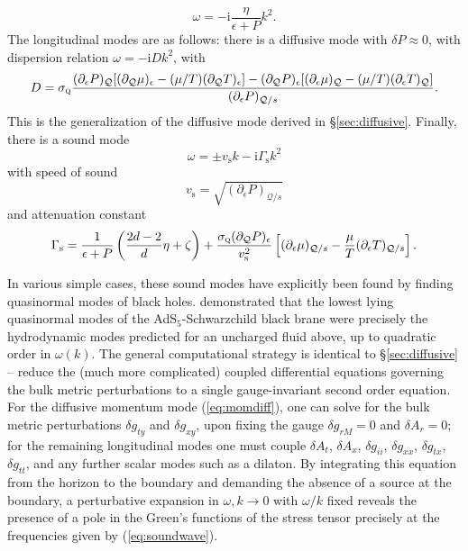 \documentclass[10pt, oneside]{book}
\begin{document}
\begin{doublespace}
\begin{equation}
\omega = -\mathrm{i} \frac{\eta}{\epsilon+P} k^2.  \label{eq:momdiff}
\end{equation}
The longitudinal modes are as follows:  there is a diffusive mode with $\delta P \approx 0$, with dispersion relation $\omega = -\mathrm{i}Dk^2$, with  \begin{equation}
D = \sigma_{\textsc{q}} \frac{(\partial_\epsilon P)_{\mathcal{Q}}[ (\partial_\mathcal{Q} \mu)_\epsilon - (\mu/T)(\partial_\mathcal{Q} T)_\epsilon] - (\partial_{\mathcal{Q}} P)_\epsilon [ (\partial_\epsilon \mu)_{\mathcal{Q}} - (\mu/T)(\partial_\epsilon T)_{\mathcal{Q}} ]}{(\partial_\epsilon P)_{\mathcal{Q}/s}}.
\end{equation}
This is the generalization of the diffusive mode derived in \S \ref{sec:diffusive}.   Finally, there is a sound mode \begin{equation}
\omega = \pm v_{\mathrm{s}} k - \mathrm{i}\Gamma_{\mathrm{s}} k^2\label{eq:soundwave}
\end{equation}
with speed of sound \begin{equation}
v_{\mathrm{s}} = \sqrt{(\partial_\epsilon P)_{\mathcal{Q}/s}}
\end{equation}and attenuation constant \begin{equation}
\Gamma_{\mathrm{s}} = \frac{1}{\epsilon+P}\left(\frac{2d-2}{d}\eta + \zeta\right) + \frac{\sigma_{\textsc{q}}(\partial_{\mathcal{Q}} P)_\epsilon}{v_{\mathrm{s}}^2}\left[(\partial_\epsilon \mu)_{\mathcal{Q}/s} - \frac{\mu}{T}(\partial_\epsilon T)_{\mathcal{Q}/s}\right]. 
\end{equation}

In various simple cases,  these sound modes have explicitly been found by finding quasinormal modes of black holes.    \cite{Policastro:2002tn, Herzog:2003ke, Kovtun:2005ev} demonstrated that the lowest lying quasinormal modes of the AdS$_5$-Schwarzchild black brane were precisely the hydrodynamic modes predicted for an uncharged fluid above,  up to quadratic order in $\omega(k)$.   The general computational strategy is identical to \S \ref{sec:diffusive} -- reduce the (much more complicated) coupled differential equations governing the bulk metric perturbations to a single gauge-invariant second order equation.   For the diffusive momentum mode (\ref{eq:momdiff}), one can solve for the bulk metric perturbations $\delta g_{ty}$ and $\delta g_{xy}$, upon fixing the gauge $\delta g_{rM}=0$ and $\delta A_r = 0$;  for the remaining longitudinal modes one must couple $\delta A_t$, $\delta A_x$, $\delta g_{ii}$, $\delta g_{xx}$, $\delta g_{tx}$, $\delta g_{tt}$, and any further scalar modes such as a dilaton.    By integrating this equation from the horizon to the boundary and demanding the absence of a source at the boundary, a perturbative expansion in $\omega ,k \rightarrow 0$ with $\omega/k$ fixed reveals the presence of a pole in the Green's functions of the stress tensor precisely at the frequencies given by (\ref{eq:soundwave}).    


\end{doublespace}
\end{document}
